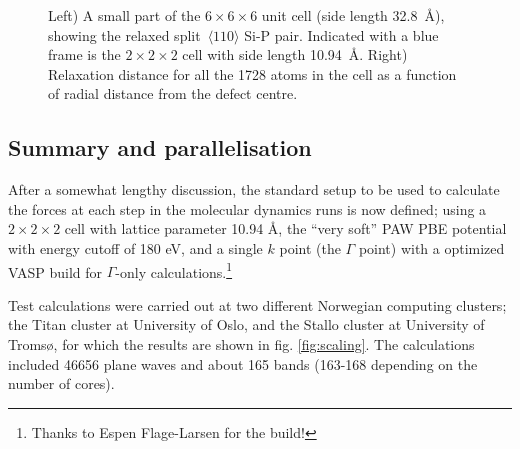 \documentclass[11pt,bibliography=totoc,index=totoc]{scrbook}   %
\begin{document}
\begin{figure}[htbp]
  \centering
  \caption{Left) A small part of the $6\times 6\times 6$ unit cell (side length 32.8~Å), showing the 
  relaxed split~$\langle 110 \rangle$ Si-P pair.
  Indicated with a blue frame is the $2\times 2\times 2$ cell with side length 10.94~Å.
  Right) Relaxation distance for all the 1728 atoms in the cell as a function of radial distance from the defect centre.}
  \label{fig:tests/cellsize}
\end{figure}

%
\subsection{Summary and parallelisation}\label{sec:parameters:summary}
%

After a somewhat lengthy discussion, the standard setup to be used to calculate the forces at each step in the molecular dynamics runs is now defined; using a $2\times 2\times 2$ cell with lattice parameter 10.94 Å, the ``very soft'' PAW PBE potential with energy cutoff of 180 eV, and a single $k$ point (the $\Gamma$ point) with a optimized VASP build for $\Gamma$-only calculations.\footnote{Thanks to Espen Flage-Larsen for the build!} 

Test calculations were carried out at two different Norwegian computing clusters; the Titan cluster at University of Oslo, 
and the Stallo cluster at University of Tromsø, for which the results are shown in fig. \ref{fig:scaling}.
The calculations included 46656 plane waves and about 165 bands (163-168 depending on the number of cores).


%
%
%
%
%
%
%
%
%
%
%
%
%
%
\end{document}
